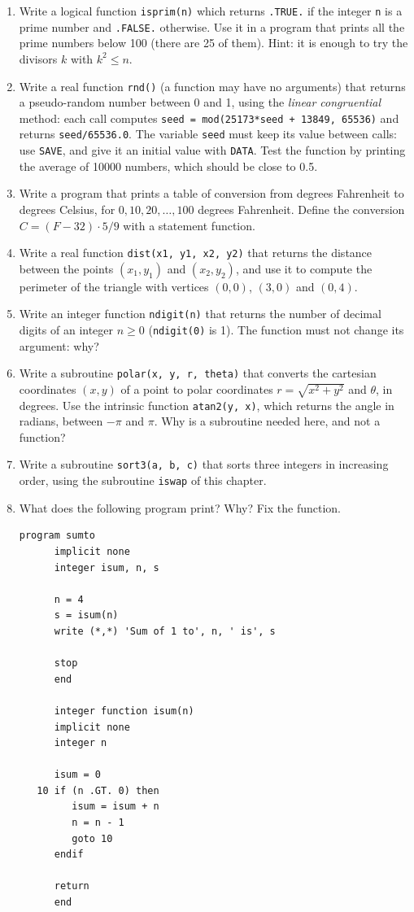 \begin{enumerate}
    \item Write a logical function \texttt{isprim(n)} which returns \texttt{.TRUE.} if the integer \texttt{n} is a prime number and \texttt{.FALSE.} otherwise. Use it in a program that prints all the prime numbers below 100 (there are 25 of them). Hint: it is enough to try the divisors $k$ with $k^2 \le n$.
    \item Write a real function \texttt{rnd()} (a function may have no arguments) that returns a pseudo-random number between 0 and 1, using the \emph{linear congruential} method: each call computes \texttt{seed = mod(25173*seed + 13849, 65536)} and returns \texttt{seed/65536.0}. The variable \texttt{seed} must keep its value between calls: use \texttt{SAVE}, and give it an initial value with \texttt{DATA}. Test the function by printing the average of 10000 numbers, which should be close to 0.5.
    \item Write a program that prints a table of conversion from degrees Fahrenheit to degrees Celsius, for $0, 10, 20, \ldots, 100$ degrees Fahrenheit. Define the conversion $C = (F - 32) \cdot 5/9$ with a statement function.
    \item Write a real function \texttt{dist(x1, y1, x2, y2)} that returns the distance between the points $(x_1, y_1)$ and $(x_2, y_2)$, and use it to compute the perimeter of the triangle with vertices $(0,0)$, $(3,0)$ and $(0,4)$.
    \item Write an integer function \texttt{ndigit(n)} that returns the number of decimal digits of an integer $n \ge 0$ (\texttt{ndigit(0)} is 1). The function must not change its argument: why?
    \item Write a subroutine \texttt{polar(x, y, r, theta)} that converts the cartesian coordinates $(x, y)$ of a point to polar coordinates $r = \sqrt{x^2 + y^2}$ and $\theta$, in degrees. Use the intrinsic function \texttt{atan2(y, x)}, which returns the angle in radians, between $-\pi$ and $\pi$. Why is a subroutine needed here, and not a function?
    \item Write a subroutine \texttt{sort3(a, b, c)} that sorts three integers in increasing order, using the subroutine \texttt{iswap} of this chapter.
    \item What does the following program print? Why? Fix the function.

\begin{lstlisting}[style=fortran77]
      program sumto
      implicit none
      integer isum, n, s

      n = 4
      s = isum(n)
      write (*,*) 'Sum of 1 to', n, ' is', s

      stop
      end

      integer function isum(n)
      implicit none
      integer n

      isum = 0
   10 if (n .GT. 0) then
         isum = isum + n
         n = n - 1
         goto 10
      endif

      return
      end
\end{lstlisting}
\end{enumerate}
